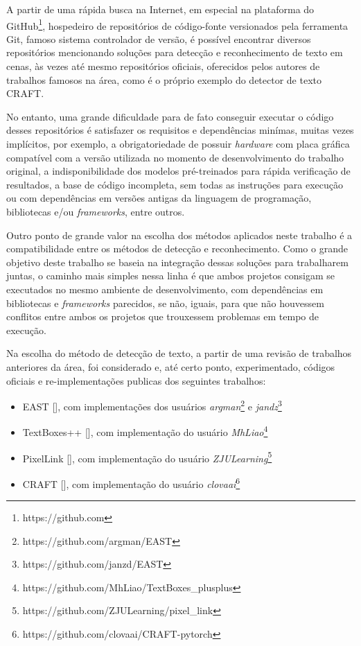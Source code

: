 A partir de uma rápida busca na Internet, em especial na plataforma do GitHub\footnote{https://github.com}, hospedeiro de repositórios de 
código-fonte versionados pela ferramenta Git, famoso sistema controlador de versão, é possível encontrar diversos repositórios mencionando 
soluções para detecção e reconhecimento de texto em cenas, às vezes até mesmo repositórios oficiais, oferecidos pelos autores de trabalhos 
famosos na área, como é o próprio exemplo do detector de texto CRAFT.

No entanto, uma grande dificuldade para de fato conseguir executar o código desses repositórios é satisfazer os requisitos e dependências 
minímas, muitas vezes implícitos, por exemplo, a obrigatoriedade de possuir \textit{hardware} com placa gráfica compatível com a versão 
utilizada no momento de desenvolvimento do trabalho original, a indisponibilidade dos modelos pré-treinados para rápida verificação de 
resultados, a base de código incompleta, sem todas as instruções para execução ou com dependências em versões antigas da linguagem de 
programação, bibliotecas e/ou \textit{frameworks}, entre outros.

Outro ponto de grande valor na escolha dos métodos aplicados neste trabalho é a compatibilidade entre os métodos de detecção e reconhecimento. 
Como o grande objetivo deste trabalho se baseia na integração dessas soluções para trabalharem juntas, o caminho mais simples nessa linha é 
que ambos projetos consigam se executados no mesmo ambiente de desenvolvimento, com dependências em bibliotecas e \textit{frameworks} parecidos, 
se não, iguais, para que não houvessem conflitos entre ambos os projetos que trouxessem problemas em tempo de execução.

Na escolha do método de detecção de texto, a partir de uma revisão de trabalhos anteriores da área, foi considerado e, até certo ponto, 
experimentado, códigos oficiais e re-implementações publicas dos seguintes trabalhos:

\begin{itemize}
    \item EAST [], com implementações dos usuários \textit{argman}\footnote{https://github.com/argman/EAST} e 
    \textit{jandz}\footnote{https://github.com/janzd/EAST}

    \item TextBoxes++ [], com implementação do usuário \textit{MhLiao}\footnote{https://github.com/MhLiao/TextBoxes\_plusplus}

    \item PixelLink [], com implementação do usuário \textit{ZJULearning}\footnote{https://github.com/ZJULearning/pixel\_link}

    \item CRAFT [], com implementação do usuário \textit{clovaai}\footnote{https://github.com/clovaai/CRAFT-pytorch}
\end{itemize}

